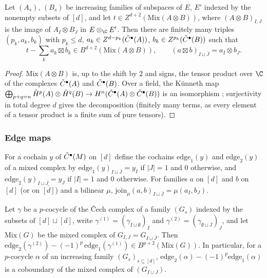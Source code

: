 \begin{lemma}\label{pf:hlf-chart:kundec}
Let $(A_s)$, $(B_s)$ be increasing families of subspaces of $E$, $E'$ indexed by the nonempty subsets of $[d]$, and let
$t\in Z^{d+2}(\mathrm{Mix}(A\otimes B))$, where $(A\otimes B)_{I,J}$ is the image of $A_I\otimes B_J$ in $E\otimes_\C E'$. Then there are finitely
many triples $(p_k,a_k,b_k)$ with $p_k\le d$, $a_k\in Z^{d-p_k}(\check{C}^\bullet(A))$, $b_k\in Z^{p_k}(\check{C}^\bullet(B))$ such that
\[
  t-\sum_k a_k\boxtimes b_k\in B^{d+2}(\mathrm{Mix}(A\otimes B)),\qquad (a\boxtimes b)_{I\sqcup\bar J}=a_I\otimes b_J .
\]
\end{lemma}

\begin{proof}
$\mathrm{Mix}(A\otimes B)$ is, up to the shift by $2$ and signs, the tensor product over $\C$ of the complexes $\check{C}^\bullet(A)$ and $\check{C}^\bullet(B)$.
Over a field, the K\"unneth map $\bigoplus_{p+q=n}\check{H}^p(A)\otimes\check{H}^q(B)\to H^n(\check{C}^\bullet(A)\otimes\check{C}^\bullet(B))$ is an isomorphism
\cite[Thm.~3.6.3]{Weibel1994}; surjectivity in total degree $d$ gives the decomposition (finitely many terms, as every element of a tensor
product is a finite sum of pure tensors).
\end{proof}

\subsubsection*{Edge maps}
For a cochain $y$ of $\check{C}^\bullet(M)$ on $[d]$ define the cochains $\mathrm{edge}_1(y)$ and $\mathrm{edge}_2(y)$ of a mixed complex by
$\mathrm{edge}_1(y)_{I\sqcup\bar J}=y_I$ if $|J|=1$ and $0$ otherwise, and $\mathrm{edge}_2(y)_{I\sqcup\bar J}=y_J$ if $|I|=1$ and $0$ otherwise.
For families $a$ on $[d]$ and $b$ on $[d]$ (or on $\bar{[d]}$) and a bilinear $\mu$, $\mathrm{join}_\mu(a,b)_{I\sqcup\bar J}=\mu(a_I,b_J)$.

\begin{lemma}\label{pf:hlf-chart:edgerel}
Let $\gamma$ be a $p$-cocycle of the \v{C}ech complex of a family $(G_s)$ indexed by the subsets of $[d]\sqcup[d]$, write
$\gamma^{(1)}=(\gamma_{I\sqcup\emptyset})_I$ and $\gamma^{(2)}=(\gamma_{\emptyset\sqcup\bar J})_J$, and let $\mathrm{Mix}(G)$ be the mixed complex of
$G_{I,J}=G_{I\sqcup\bar J}$. Then $\mathrm{edge}_2(\gamma^{(2)})-(-1)^p\,\mathrm{edge}_1(\gamma^{(1)})\in B^{p+2}(\mathrm{Mix}(G))$. In particular, for
a $p$-cocycle $\alpha$ of an increasing family $(G_s)_{s\subseteq[d]}$, $\mathrm{edge}_2(\alpha)-(-1)^p\mathrm{edge}_1(\alpha)$ is a coboundary of
the mixed complex of $(G_{I\cup J})$.
\end{lemma}

